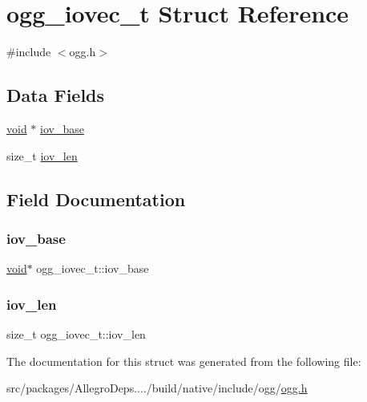 \hypertarget{structogg__iovec__t}{}\section{ogg\+\_\+iovec\+\_\+t Struct Reference}
\label{structogg__iovec__t}


{\ttfamily \#include $<$ogg.\+h$>$}

\subsection*{Data Fields}
\begin{DoxyCompactItemize}
\item 
\hyperlink{png_8h_ac9c84fa68bbad002983e35ce3663c686}{void} $\ast$ \hyperlink{structogg__iovec__t_a07c65ea68e539cc10ed1670c0de8aea0}{iov\+\_\+base}
\item 
size\+\_\+t \hyperlink{structogg__iovec__t_a52b887e0511104920cdc181c9e4136ce}{iov\+\_\+len}
\end{DoxyCompactItemize}


\subsection{Field Documentation}
\mbox{\label{structogg__iovec__t_a07c65ea68e539cc10ed1670c0de8aea0}} 
\subsubsection{\texorpdfstring{iov\+\_\+base}{iov\_base}}
{\footnotesize\ttfamily \hyperlink{png_8h_ac9c84fa68bbad002983e35ce3663c686}{void}$\ast$ ogg\+\_\+iovec\+\_\+t\+::iov\+\_\+base}

\mbox{\label{structogg__iovec__t_a52b887e0511104920cdc181c9e4136ce}} 
\subsubsection{\texorpdfstring{iov\+\_\+len}{iov\_len}}
{\footnotesize\ttfamily size\+\_\+t ogg\+\_\+iovec\+\_\+t\+::iov\+\_\+len}



The documentation for this struct was generated from the following file\+:\begin{DoxyCompactItemize}
\item 
src/packages/\+Allegro\+Deps..../build/native/include/ogg/\hyperlink{ogg_8h}{ogg.\+h}\end{DoxyCompactItemize}
